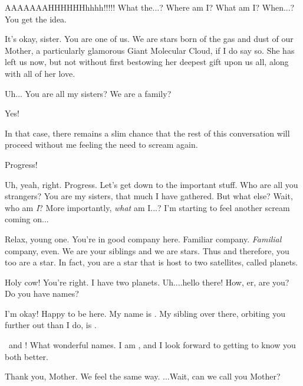 \documentclass[main.tex]{subfiles}
\begin{document}
\par \Sterope AAAAAAAHHHHHHhhhh!!!!!  What the...?  Where am I?  What am I?  When...?  You get the idea.

\par \Maia It's okay, sister.  You are one of us.  We are stars born of the gas and dust of our Mother, a particularly glamorous Giant Molecular Cloud, if I do say so.  She has left us now, but not without first bestowing her deepest gift upon us all, along with all of her love.

\par \Sterope  Uh... You are all my sisters?  We are a family?

\par \Maia Yes!

\par \Sterope  In that case, there remains a slim chance that the rest of this conversation will proceed without me feeling the need to scream again.

\par \Maia Progress!

\par \Sterope Uh, yeah, right.  Progress.  Let's get down to the important stuff.  Who are all you strangers?  You are my sisters, that much I have gathered.  But what else?  Wait, who am \textit{I}?  More importantly, \textit{what} am I...?  I'm starting to feel another scream coming on...

\par \Maia Relax, young one.  You're in good company here.  Familiar company.  \textit{Familial} company, even. We are your siblings and we are stars.  Thus and therefore, you too are a star.  In fact, you are a star that is host to two satellites, called planets. 

\par \Sterope Holy cow!  You're right.  I have two planets.  Uh....hello there!  How, er, are you?  Do you have names?

\par \Alphab I'm okay!  Happy to be here.  My name is \rmalpha.  My sibling over there, orbiting you further out than I do, is \rmbeta.

\par \Sterope \rmalpha~and \rmbeta!  What wonderful names.  I am \rmsterope, and I look forward to getting to know you both better.

\par \Betab Thank you, Mother.  We feel the same way. ...Wait, can we call you Mother?
\end{document}
